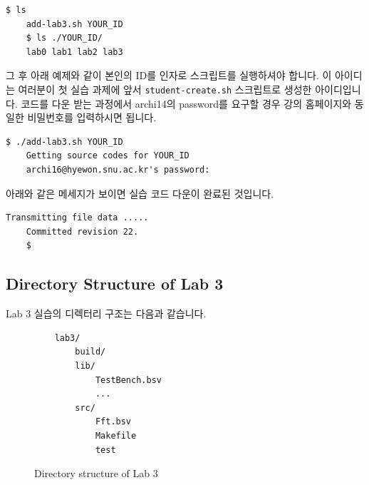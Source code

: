 \documentclass{article}
\begin{document}
\begin{Verbatim}[frame=single]
	$ ls
	add-lab3.sh YOUR_ID
	$ ls ./YOUR_ID/
	lab0 lab1 lab2 lab3
\end{Verbatim}
그 후 아래 예제와 같이 본인의 ID를 인자로 스크립트를 실행하셔야 합니다.
이 아이디는 여러분이 첫 실습 과제에 앞서 \texttt{student-create.sh} 스크립트로 생성한 아이디입니다.
코드를 다운 받는 과정에서 archi14의 password를 요구할 경우 강의 홈페이지와 동일한 비밀번호를 입력하시면 됩니다.

\begin{Verbatim}[frame=single]
	$ ./add-lab3.sh YOUR_ID
	Getting source codes for YOUR_ID
	archi16@hyewon.snu.ac.kr's password: 
\end{Verbatim}
아래와 같은 메세지가 보이면 실습 코드 다운이 완료된 것입니다.
\begin{Verbatim}[frame=single]
	Transmitting file data .....
	Committed revision 22.
	$
\end{Verbatim}

\subsection{Directory Structure of Lab 3}
Lab 3 실습의 디렉터리 구조는 다음과 같습니다.

\begin{figure}[!h]
\begin{verbatim}
    lab3/	
        build/
        lib/
            TestBench.bsv
            ...
        src/
            Fft.bsv
            Makefile
            test
\end{verbatim}
\caption{Directory structure of Lab 3}
\label{fig:files}
\end{figure}
\end{document}
